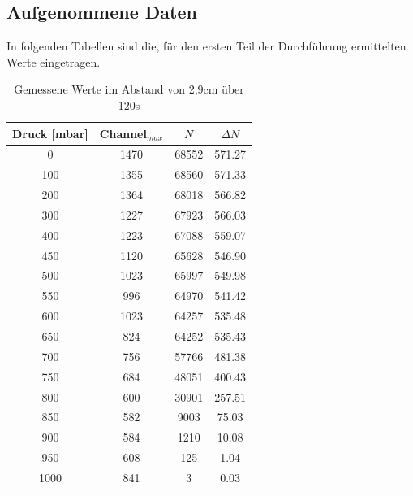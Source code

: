 \subsection{Aufgenommene Daten}
In folgenden Tabellen sind die, für den ersten Teil der Durchführung ermittelten Werte eingetragen.
\begin{table}[H]
\renewcommand{\arraystretch}{.95}
\begin{tabular}{|c|c|c|c|} 
Druck [mbar]	&Channel$_{max}$	&$N$	&$\Delta N$\\ \hline
0		&1470	&68552	&571.27\\ \hline
100		&1355	&68560	&571.33\\ \hline
200		&1364	&68018	&566.82\\ \hline
300		&1227	&67923	&566.03\\ \hline
400		&1223	&67088	&559.07\\ \hline
450		&1120	&65628	&546.90\\ \hline
500		&1023	&65997	&549.98\\ \hline
550		&996	&64970	&541.42\\ \hline
600		&1023	&64257	&535.48\\ \hline
650		&824	&64252	&535.43\\ \hline
700		&756	&57766	&481.38\\ \hline
750		&684	&48051	&400.43\\ \hline
800		&600	&30901	&257.51\\ \hline
850		&582	&9003	&75.03\\ \hline
900		&584	&1210	&10.08\\ \hline
950		&608	&125	&1.04\\ \hline
1000	&841	&3		&0.03\\ \hline
\end{tabular}
\renewcommand{\arraystretch}{1}
\caption{Gemessene Werte im Abstand von 2,9cm über 120s}
\end{table}

